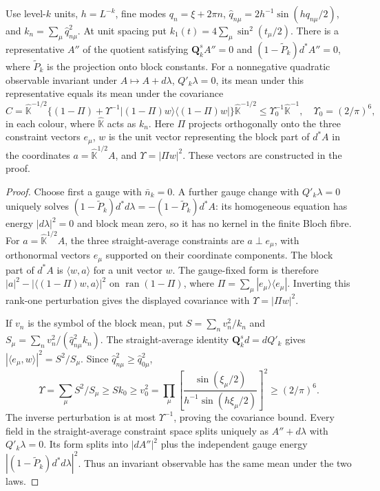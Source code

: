 \documentclass[11pt,letterpaper,reqno]{amsart}
\makeatletter
\theoremstyle{definition}
\newcommand{\ms@minorstart}{%
  \pushQED{\qed}\renewcommand{\qedsymbol}{$\blacksquare$}}
\newenvironment{lemma}[1][]{\ms@minorstart\ms@lemma[#1]}
  {\popQED\endms@lemma}
\theoremstyle{remark}
\makeatother
\begin{document}
\begin{lemma}[The constrained covariance]\label{C-398-11}
Use level-$k$ units, $h=L^{-k}$, fine modes
$q_n=\xi+2\pi n$, $\hat q_{n\mu}=2h^{-1}\sin(hq_{n\mu}/2)$,
and $k_n=\sum_\mu\hat q_{n\mu}^2$.
At unit spacing put $k_1(t)=4\sum_\mu\sin^2(t_\mu/2)$.
There is a representative $A''$ of the quotient satisfying
$\mathbf Q_k^sA''=0$ and $(1-\widetilde P_k)d^*A''=0$,
where $\widetilde P_k$ is the projection onto block constants.
For a nonnegative quadratic observable invariant under
$A\mapsto A+d\lambda$, $Q'_k\lambda=0$, its mean under
this representative equals its mean under the covariance
\[
 \widehat C=\widehat{\mathbb K}^{-1/2}
 \{(1-\Pi)+\Upsilon^{-1}|(1-\Pi)w\rangle
                          \langle(1-\Pi)w|\}
                   \widehat{\mathbb K}^{-1/2}
 \le\Upsilon_0^{-1}\widehat{\mathbb K}^{-1},
 \quad\Upsilon_0=(2/\pi)^6,
\]
in each colour, where $\widehat{\mathbb K}$ acts as $k_n$.
Here $\Pi$ projects orthogonally onto the three constraint
vectors $e_\mu$, $w$ is the unit vector representing the block
part of $d^*A$ in the coordinates
$a=\widehat{\mathbb K}^{1/2}A$, and $\Upsilon=|\Pi w|^2$.
These vectors are constructed in the proof.
\end{lemma}

\begin{proof}
Choose first a gauge with $\bar n_k=0$.  A further gauge
change with $Q'_k\lambda=0$ uniquely solves
$(1-\widetilde P_k)d^*d\lambda=
 -(1-\widetilde P_k)d^*A$:
its homogeneous equation has energy $|d\lambda|^2=0$ and
block mean zero, so it has no kernel in the finite Bloch fibre.
For $a=\widehat{\mathbb K}^{1/2}A$, the three straight-average
constraints are $a\perp e_\mu$, with orthonormal vectors
$e_\mu$ supported on their coordinate components.  The block
part of $d^*A$ is $\langle w,a\rangle$ for a unit vector $w$.
The gauge-fixed form is therefore
$|a|^2-|\langle(1-\Pi)w,a\rangle|^2$ on
$\operatorname{ran}(1-\Pi)$, where
$\Pi=\sum_\mu|e_\mu\rangle\langle e_\mu|$.
Inverting this rank-one perturbation gives the displayed
covariance with $\Upsilon=|\Pi w|^2$.

If $v_n$ is the symbol of the block mean, put
$S=\sum_nv_n^2/k_n$ and
$S_\mu=\sum_nv_n^2/(\hat q_{n\mu}^2k_n)$.
The straight-average identity $\mathbf Q_k^sd=dQ'_k$
gives $|\langle e_\mu,w\rangle|^2=S^2/S_\mu$.
Since $\hat q_{n\mu}^2\ge\hat q_{0\mu}^2$,
\[
 \Upsilon=\sum_\mu S^2/S_\mu\ge Sk_0\ge v_0^2
 =\prod_\mu\left[\frac{\sin(\xi_\mu/2)}
                       {h^{-1}\sin(h\xi_\mu/2)}\right]^2
 \ge(2/\pi)^6.
\]
The inverse perturbation is at most $\Upsilon^{-1}$, proving
the covariance bound.  Every field in the straight-average
constraint space splits uniquely as $A''+d\lambda$ with
$Q'_k\lambda=0$.  Its form splits into $|dA''|^2$ plus the
independent gauge energy
$|(1-\widetilde P_k)d^*d\lambda|^2$.  Thus an invariant
observable has the same mean under the two laws.
\end{proof}
\end{document}
